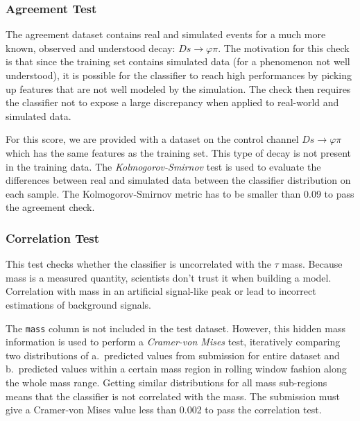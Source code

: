 \documentclass[conference]{IEEEtran}
\begin{document}
\subsubsection{Agreement Test}
\label{sec:agreement}
The agreement dataset contains real and simulated events for a much more known,
observed and understood decay: $Ds \rightarrow \varphi\pi$. The motivation for
this check is that since the training set contains simulated data (for a
phenomenon not well understood), it is possible for the classifier to reach high
performances by picking up features that are not well modeled by the simulation.
The check then requires the classifier not to expose a large discrepancy when
applied to real-world and simulated data.

For this score, we are provided with a dataset on the control channel $Ds
\rightarrow \varphi\pi$ which has the same features as the training set. This
type of decay is not present in the training data. The
\textit{Kolmogorov-Smirnov} test is used to evaluate the differences between
real and simulated data between the classifier distribution on each sample.
The Kolmogorov-Smirnov metric has to be smaller than 0.09 to pass the agreement
check.

\subsubsection{Correlation Test}
\label{sec:correlation}
This test checks whether the classifier is uncorrelated with the $\tau$ mass.
Because mass is a measured quantity, scientists don't trust it when building a
model. Correlation with mass in an artificial signal-like peak or lead to
incorrect estimations of background signals.

The \texttt{mass} column is not included in the test dataset. However, this hidden
mass information is used to perform a \textit{Cramer-von Mises} test,
iteratively comparing two distributions of a.\ predicted values from submission
for entire dataset and b.\ predicted values within a certain mass region in
rolling window fashion along the whole mass range. Getting similar distributions
for all mass sub-regions means that the classifier is not correlated with the
mass. The submission must give a Cramer-von Mises value less than 0.002 to pass
the correlation test.
\end{document}
